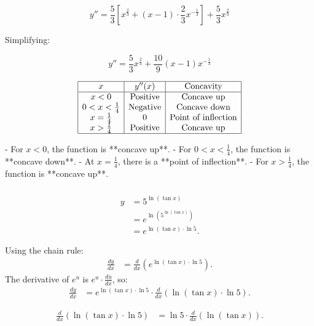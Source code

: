 \documentclass{article}
\begin{document}
		\[
		y'' = \frac{5}{3} \left[ x^{\frac{2}{3}} + (x - 1) \cdot \frac{2}{3} x^{-\frac{1}{3}} \right] + \frac{5}{3} x^{\frac{2}{3}}
		\]
		
		Simplifying:
		
		\[
		y'' = \frac{5}{3} x^{\frac{2}{3}} + \frac{10}{9} (x - 1) x^{-\frac{1}{3}}
		\]
		
		\[
		\begin{array}{|c|c|c|}
			\hline
			x & y''(x) & \text{Concavity} \\
			\hline
			x < 0 & \text{Positive} & \text{Concave up} \\
			0 < x < \frac{1}{4} & \text{Negative} & \text{Concave down} \\
			x = \frac{1}{4} & 0 & \text{Point of inflection} \\
			x > \frac{1}{4} & \text{Positive} & \text{Concave up} \\
			\hline
		\end{array}
		\]
		
			- For \( x < 0 \), the function is **concave up**.
		- For \( 0 < x < \frac{1}{4} \), the function is **concave down**.
		- At \( x = \frac{1}{4} \), there is a **point of inflection**.
		- For \( x > \frac{1}{4} \), the function is **concave up**.
		

	
	\subsubsection{}
	 
	

	

\begin{align*}
	y &= 5^{\ln{(\tan{x})}} \\
	&= e^{\ln{(5^{\ln{(\tan{x})}})}} \\
	&= e^{\ln{(\tan{x})} \cdot \ln{5}}.
\end{align*}


Using the chain rule:
\begin{align*}
	\frac{dy}{dx} &= \frac{d}{dx} \left( e^{\ln{(\tan{x})} \cdot \ln{5}} \right).
\end{align*}
The derivative of \( e^u \) is \( e^u \cdot \frac{du}{dx} \), so:
\begin{align*}
	\frac{dy}{dx} &= e^{\ln{(\tan{x})} \cdot \ln{5}} \cdot \frac{d}{dx} \left( \ln{(\tan{x})} \cdot \ln{5} \right).
\end{align*}


\begin{align*}
	\frac{d}{dx} \left( \ln{(\tan{x})} \cdot \ln{5} \right) &= \ln{5} \cdot \frac{d}{dx} \left( \ln{(\tan{x})} \right).
\end{align*}
\end{document}
